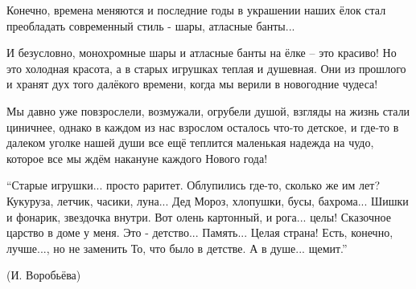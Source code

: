 Конечно, времена меняются и  последние годы в украшении наших ёлок стал
преобладать современный стиль - шары, атласные банты...

И безусловно, монохромные шары и атласные банты на ёлке – это красиво! Но это
холодная красота, а в старых игрушках теплая и душевная. Они из прошлого и
хранят дух того далёкого времени, когда мы верили в новогодние чудеса!

Мы давно уже повзрослели, возмужали, огрубели душой, взгляды на жизнь стали
циничнее, однако в каждом из нас взрослом осталось что-то детское, и  где-то в
далеком уголке нашей души все ещё теплится маленькая надежда на чудо, которое
все мы ждём накануне каждого Нового года!

\begin{zznagolos}
\obeycr
\enquote{Старые игрушки... просто раритет.
Облупились где-то, сколько же им лет?
Кукуруза, летчик, часики, луна...
Дед Мороз, хлопушки, бусы, бахрома...
Шишки и фонарик, звездочка внутри.
Вот олень картонный, и рога... целы!
Сказочное царство в доме у меня.
Это - детство... Память... Целая страна!
Есть, конечно, лучше..., но не заменить
То, что было в детстве. А в душе... щемит.}
\restorecr

(И. Воробьёва)
\end{zznagolos}

